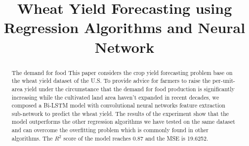 \documentclass[conference, a4paper]{IEEEtran}
\begin{document}
\title{Wheat Yield Forecasting using Regression Algorithms and Neural Network}
\author{
\and
{}
\and
{}
\and
{}
}

\maketitle

\begin{abstract}
  The demand for food 
  This paper considers the crop yield forecasting problem base on the wheat yield dataset of the U.S. To provide advice for farmers to raise the per-unit-area yield under the circumstance that the demand for food production is significantly increasing while the cultivated land area haven't expanded in recent decades, we composed a Bi-LSTM model with convolutional neural networks feature extraction sub-network to predict the wheat yield. The results of the experiment show that the model outperforms the other regression algorithms we have tested on the same dataset and can overcome the overfitting problem which is commonly found in other algorithms. The $R^2$ score of the model reaches 0.87 and the MSE is 19.6252. 
\end{abstract}
\end{document}
